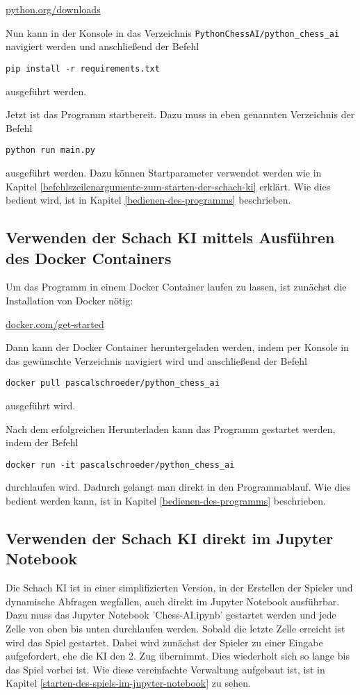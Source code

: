 \href{https://www.python.org/downloads/}{python.org/downloads}

Nun kann in der Konsole in das Verzeichnis
\texttt{PythonChessAI/python\_chess\_ai} navigiert werden und
anschließend der Befehl

\texttt{pip\ install\ -r\ requirements.txt}

ausgeführt werden.

Jetzt ist das Programm startbereit. Dazu muss in eben genannten
Verzeichnis der Befehl

\texttt{python\ run\ main.py}

ausgeführt werden. Dazu können Startparameter verwendet werden wie in
Kapitel \ref{befehlszeilenargumente-zum-starten-der-schach-ki} erklärt. Wie dies bedient
wird, ist in Kapitel \ref{bedienen-des-programms} beschrieben.

\subsection{Verwenden der Schach KI mittels Ausführen des Docker
Containers}\label{verwenden-der-schach-ki-mittels-ausfuxfchren-des-docker-containers}

Um das Programm in einem Docker Container laufen zu lassen, ist zunächst
die Installation von Docker nötig:

\href{https://www.docker.com/get-started}{docker.com/get-started}

Dann kann der Docker Container heruntergeladen werden, indem per Konsole
in das gewünschte Verzeichnis navigiert wird und anschließend der Befehl

\texttt{docker\ pull\ pascalschroeder/python\_chess\_ai}

ausgeführt wird.

Nach dem erfolgreichen Herunterladen kann das Programm gestartet werden,
indem der Befehl

\texttt{docker\ run\ -it\ pascalschroeder/python\_chess\_ai}

durchlaufen wird. Dadurch gelangt man direkt in den Programmablauf. Wie
dies bedient werden kann, ist in Kapitel \ref{bedienen-des-programms} beschrieben.

\subsection{Verwenden der Schach KI direkt im Jupyter Notebook}\label{verwenden-der-schach-ki-direkt-im-jupyter-notebook}

Die Schach KI ist in einer simplifizierten Version, in der Erstellen der Spieler und dynamische Abfragen wegfallen, auch direkt im Jupyter Notebook ausführbar. Dazu muss das Jupyter Notebook 'Chess-AI.ipynb' gestartet werden und jede Zelle von oben bis unten durchlaufen werden. Sobald die letzte Zelle erreicht ist wird das Spiel gestartet. Dabei wird zunächst der Spieler zu einer Eingabe aufgefordert, ehe die KI den 2. Zug übernimmt. Dies wiederholt sich so lange bis das Spiel vorbei ist. Wie diese vereinfachte Verwaltung aufgebaut ist, ist in Kapitel \ref{starten-des-spiels-im-jupyter-notebook} zu sehen.

